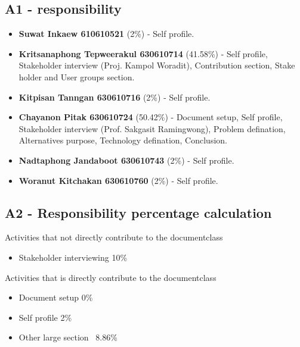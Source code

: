 \documentclass[a4paper, 12pt]{report}
\begin{document}
        \subsection*{A1 - responsibility}
        \begin{itemize}
            \item \textbf{Suwat Inkaew 610610521} (2\%) - Self profile.
            \item \textbf{Kritsanaphong Tepweerakul 630610714} (41.58\%) - Self profile, Stakeholder interview (Proj. Kampol Woradit), Contribution section, Stake holder and User groups section.
            \item \textbf{Kitpisan Tanngan 630610716} (2\%) - Self profile.
            \item \textbf{Chayanon Pitak 630610724} (50.42\%) - Document setup, Self profile, Stakeholder interview (Prof. Sakgasit Ramingwong), Problem defination, Alternatives purpose, Technology defination, Conclusion.
            \item \textbf{Nadtaphong Jandaboot 630610743} (2\%) - Self profile.
            \item \textbf{Woranut Kitchakan 630610760} (2\%) - Self profile.
        \end{itemize}

        \subsection*{A2 - Responsibility percentage calculation}

        Activities that not directly contribute to the documentclass
        \begin{itemize}
            \item Stakeholder interviewing 10\%
        \end{itemize}
        Activities that is directly contribute to the documentclass
        \begin{itemize}
            \item Document setup 0\%
            \item Self profile 2\%
            \item Other large section ~8.86\%
        \end{itemize}
    
\end{document}
